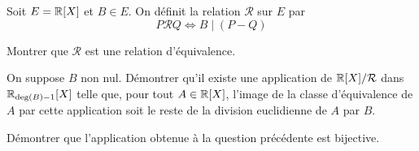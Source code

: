 \documentclass{report}
\begin{document}
\begin{exo}
    Soit \(E=\mathbb{R}[X]\) et \(B\in E\). On définit la relation \(\mathcal{R}\) sur \(E\) par
    \[P\mathcal{R}Q \Leftrightarrow B\mid\left(P-Q\right)\]
    \begin{q}{1}
        Montrer que \(\mathcal{R}\) est une relation d'équivalence.
    \end{q}
    \begin{q}{2}
        On suppose \(B\) non nul. Démontrer qu'il existe une application
        de \(\mathbb{R}[X]/\mathcal{R}\) dans \(\mathbb{R}_{\deg(B)-1}[X]\) telle que, pour tout
        \(A\in\mathbb{R}[X]\), l'image de la classe d'équivalence de \(A\) par cette application
        soit le reste de la division euclidienne de \(A\) par \(B\).
    \end{q}
    \begin{q}{3}
        Démontrer que l'application obtenue à la question précédente est bijective.
    \end{q}
\end{exo}
\end{document}
